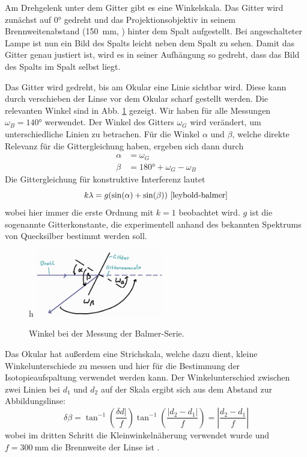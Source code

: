\documentclass{article}
\begin{document}
Am Drehgelenk unter dem Gitter gibt es eine Winkelskala. Das Gitter wird zunächst auf \ang{0} gedreht und das Projektionsobjektiv in seinem Brennweitenabstand
(\SI{150}{\mm}, \cite{Anleitung}) hinter dem Spalt aufgestellt. Bei angeschalteter Lampe ist nun ein Bild des Spalts leicht neben dem Spalt zu sehen.
Damit das Gitter genau justiert ist, wird es in seiner Aufhängung so gedreht, dass das Bild des Spalts im Spalt selbst liegt.

Das Gitter wird gedreht, bis am Okular eine Linie sichtbar wird. Diese kann durch verschieben der Linse vor dem Okular scharf gestellt werden.
Die relevanten Winkel sind in Abb. \ref{fig:balmer-winkel} gezeigt. Wir haben für alle Messungen $\omega_B = \ang{140}$ werwendet.
Der Winkel des Gitters $\omega_G$ wird verändert, um unterschiedliche Linien zu betrachen. Für die Winkel $\alpha$ und $\beta$, welche
direkte Relevanz für die Gittergleichung haben, ergeben sich dann durch
\begin{align}
  \alpha &= \omega_G \nonumber \\
  \beta &= \ang{180} + \omega_G - \omega_B \label{eq:balmer-winkel}
\end{align}
Die Gittergleichung für konstruktive Interferenz lautet
\begin{equation}
  k\lambda = g(\sin(\alpha) + \sin(\beta)) \label{eq:gittergleichung}\ \cite{leybold-balmer}
\end{equation}
wobei hier immer die erste Ordnung mit $k=1$ beobachtet wird. $g$ ist die sogenannte Gitterkonstante,
die experimentell anhand des bekannten Spektrums von Quecksilber bestimmt werden soll.

\begin{figure}{h}
  \centering
  \includegraphics[width=0.5\textwidth]{balmer-winkel}
  \caption{Winkel bei der Messung der Balmer-Serie.}
  \label{fig:balmer-winkel}
\end{figure}

Das Okular hat außerdem eine Strichskala, welche dazu dient, kleine Winkelunterschiede zu messen und
hier für die Bestimmung der Isotopieaufspaltung verwendet werden kann.
Der Winkelunterschied zwischen zwei Linien bei $d_1$ und $d_2$ auf der Skala ergibt sich aus dem Abstand zur Abbildungslinse:
\begin{equation}
  \delta \beta = \tan^{-1}\left(\frac{\delta d \rvert}{f}\right) \tan^{-1}\left(\frac{\lvert d_2-d_1 \rvert}{f}\right) = \left\lvert \frac{d_2-d_1}{f} \right\rvert \label{eq:winkelunterschied}
\end{equation}
wobei im dritten Schritt die Kleinwinkelnäherung verwendet wurde und $f=\SI{300}{\mm}$ die Brennweite der Linse ist \cite{Anleitung}.
\end{document}
